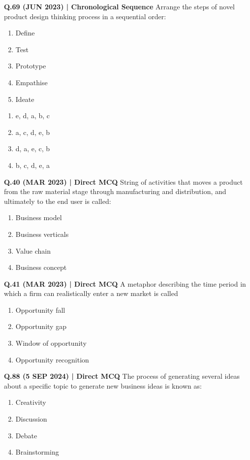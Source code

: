 \documentclass{article}
\begin{document}
\textbf{Q.69 (JUN 2023) | Chronological Sequence}
Arrange the steps of novel product design thinking process in a sequential order:
\begin{enumerate}[label=\alph*.]
    \item Define
    \item Test
    \item Prototype
    \item Empathise
    \item Ideate
\end{enumerate}
\begin{enumerate}[label=(\arabic*)]
    \item e, d, a, b, c
    \item a, c, d, e, b
    \item d, a, e, c, b
    \item b, c, d, e, a
\end{enumerate}

\textbf{Q.40 (MAR 2023) | Direct MCQ}
String of activities that moves a product from the raw material stage through manufacturing and distribution, and ultimately to the end user is called:
\begin{enumerate}[label=(\arabic*)]
    \item Business model
    \item Business verticals
    \item Value chain
    \item Business concept
\end{enumerate}

\textbf{Q.41 (MAR 2023) | Direct MCQ}
A metaphor describing the time period in which a firm can realistically enter a new market is called
\begin{enumerate}[label=(\arabic*)]
    \item Opportunity fall
    \item Opportunity gap
    \item Window of opportunity
    \item Opportunity recognition
\end{enumerate}

\textbf{Q.88 (5 SEP 2024) | Direct MCQ}
The process of generating several ideas about a specific topic to generate new business ideas is known as:
\begin{enumerate}[label=(\arabic*)]
    \item Creativity
    \item Discussion
    \item Debate
    \item Brainstorming
\end{enumerate}
\end{document}
